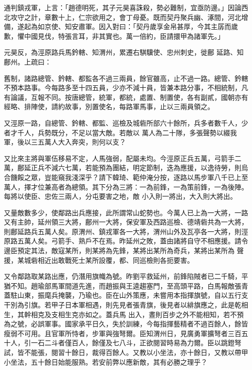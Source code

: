\begin{pinyinscope}
 通判鎮戎軍，上言：「趙德明死，其子元昊喜誅殺，勢必難制，宜亟防邊。」因論西北攻守之計，章數十上，仁宗欲用之，會丁母憂。既而契丹聚兵幽、涿間，河北增備，遂起為如京使、知安肅軍。因入對曰：「契丹歲享金帛甚厚，今其主孱而歲歉，懼中國見伐，特張言耳，非其實也。萬一倍約，臣請擐甲為諸軍先。」



 元昊反，為涇原路兵馬鈐轄、知渭州，累遷右騏驥使、忠州刺史，徙鄜
 延路、知鄜州。上疏曰：



 舊制，諸路總管、鈐轄、都監各不過三兩員，餘官雖高，止不過一路。總管、鈐轄不預本路事。今每路多至十四五員，少亦不減十員，皆兼本路分事，不相統制，凡有論議，互報不同。按唐總管，統軍，都統，處置、制置使，各有副貳，國朝亦有經略、排陣使，請約故事，別置使名，每路軍馬事，止以三兩員領之。



 又涇原一路，自總管、鈐轄、都監、巡檢及城砦所部六十餘所，兵多者數千人，少者才千人，兵勢既分，不足以當大敵。若敵以
 萬人為二十隊，多張聲勢以綴我軍，後以三五萬人大入奔突，則何以支？



 又比來主將與軍伍移易不定，人馬強弱，配屬未均。今涇原正兵五萬，弓箭手二萬，鄜延正兵不減六七萬，若能預為團結，明定節制，迭為應援，以逸待勞，則烏合饑餒之眾，豈能窺我淺深乎？請下韓琦、範仲淹分按，逐路以馬步軍八千已上至萬人，擇才位兼高者為總領。其下分為三將：一為前鋒，一為策前鋒，一為後陣。每將以使臣、忠佐三兩人，分屯要害之地，敵
 小入則一將出，大入則大將出。



 又量敵數多少，使鄰路出兵應接，此所謂常山蛇勢也。今萬人已上為一大將，一路又有主帥，延州領三大將，鄜州一大將，保安軍及西路巡檢、德靖砦共為一大將，則鄜延路兵五萬人矣。原渭州、鎮戎軍各一大將，渭州山外及瓦亭各一大將，則涇原路五萬人矣。弓箭手、熟戶不在焉。昨延州之敗，蓋由諸將自守不相應援。請令邊臣預定其法，敵寇某所，則某將為先鋒，某將出某所為奇兵，某將出某所為
 聲援，某城砦相近出敢戰死士某所設覆，都、同巡檢則各扼要害。



 又令鄰路取某路出應，仍潛用旗幟為號。昨劉平救延州，前鋒陷賊者已二千騎，平猶不知。趙瑜部馬軍間道先進，而趙振與王逵趨塞門，至高頭平路，白馬報敵張青蓋駐山東，振麾兵掩襲，乃瑜也。臣在山外策應，未嘗用本指揮旗號，自以五行支干別為引旗。若甲子日本軍相遇，則先見者張青旗，後見者以緋旗應之，此是乾相生，其幹相克及支相生克亦如之。蓋兵馬
 出入，晝則百步之外不能相知，若不預為之號，必誤軍事。國家承平日久，失於訓練，今每指揮藝精者不過百餘人，餘皆瘦弱不可用。且官軍所恃者，步軍與強弩爾。臣知渭州日，見廣勇軍擴弩者三百五十人，引一石二斗者僅百人，餘僅及七八斗，正欲閱習時易為力爾。臣以跳鐙弩試，皆不能張，閱習十餘日，裁得百餘人。又教以小坐法，亦十餘日，又教以帶甲小坐法，五十餘日始能服熟。若安前弊以應新敵，其有必勝之理乎？




\end{pinyinscope}
